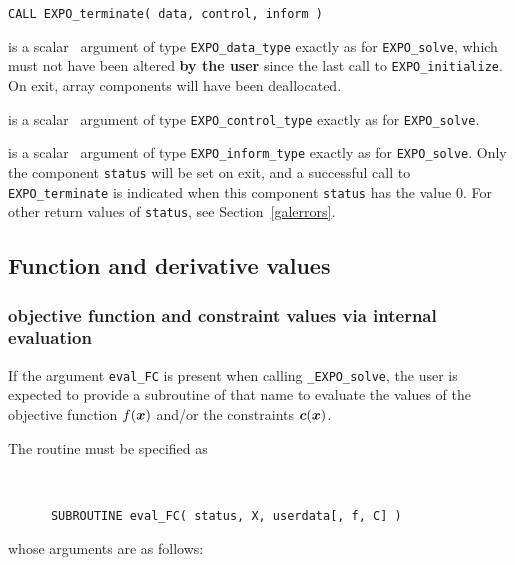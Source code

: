\documentclass{galahad}
\newcommand{\packagename}{EXPO}
\newcommand{\fullpackagename}{\libraryname\_\packagename}
\newcommand{\solver}{{\tt \fullpackagename\_solve}}
\begin{document}
\hspace{8mm}
{\tt CALL \packagename\_terminate( data, control, inform )}

\vspace*{-1mm}
\begin{description}

 is a scalar \intentinout\ argument of type
{\tt \packagename\_data\_type}
exactly as for
{\tt \packagename\_solve},
which must not have been altered {\bf by the user} since the last call to
{\tt \packagename\_initialize}.
On exit, array components will have been deallocated.

 is a scalar \intentin\ argument of type
{\tt \packagename\_control\_type}
exactly as for
{\tt \packagename\_solve}.

 is a scalar \intentout\ argument of type
{\tt \packagename\_inform\_type}
exactly as for
{\tt \packagename\_solve}.
Only the component {\tt status} will be set on exit, and a
successful call to
{\tt \packagename\_terminate}
is indicated when this  component {\tt status} has the value 0.
For other return values of {\tt status}, see Section~\ref{galerrors}.

\end{description}


\subsection{Function and derivative values\label{fdv}}


\subsubsection{objective function and constraint values via internal evaluation\label{fcfv}}

If the argument {\tt eval\_FC} is present when calling \solver, the
user is expected to provide a subroutine of that name to evaluate the
values of the objective function $f({\bm{x}})$ and/or the constraints ${\bm{c}}({\bm{x}})$.

The routine must be specified as

\def\baselinestretch{0.8}
{\tt
\begin{verbatim}
      SUBROUTINE eval_FC( status, X, userdata[, f, C] )
\end{verbatim}
}
\def\baselinestretch{1.0}
\noindent whose arguments are as follows:
\end{document}
